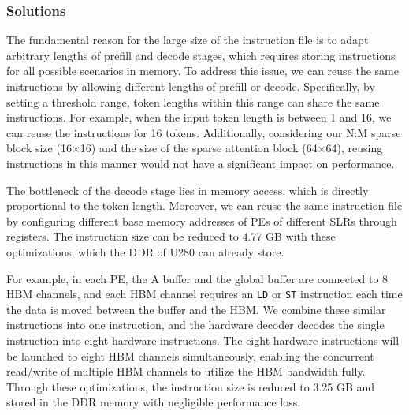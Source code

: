 \subsubsection{Solutions}
The fundamental reason for the large size of the instruction file is to adapt arbitrary lengths of prefill and decode stages, which requires storing instructions for all possible scenarios in memory. To address this issue, we can reuse the same instructions by allowing different lengths of prefill or decode. Specifically, by setting a threshold range, token lengths within this range can share the same instructions. For example, when the input token length is between 1 and 16, we can reuse the instructions for 16 tokens. Additionally, considering our N:M sparse block size (16$\times$16) and the size of the sparse attention block (64$\times$64), reusing instructions in this manner would not have a significant impact on performance.

 The bottleneck of the decode stage lies in memory access, which is directly proportional to the token length.
 Moreover, we can reuse the same instruction file by configuring different base memory addresses of PEs of different SLRs through registers. The instruction size can be reduced to 4.77 GB with these optimizations, which the DDR of U280 can already store.

For example, in each PE, the A buffer and the global buffer are connected to 8 HBM channels, and each HBM channel requires an \texttt{LD} or \texttt{ST} instruction each time the data is moved between the buffer and the HBM. We combine these similar instructions into one instruction, and the hardware decoder decodes the single instruction into eight hardware instructions. The eight hardware instructions will be launched to eight HBM channels simultaneously, enabling the concurrent read/write of multiple HBM channels to utilize the HBM bandwidth fully. 
Through these optimizations, the instruction size is reduced to 3.25 GB and stored in the DDR memory with negligible performance loss.

